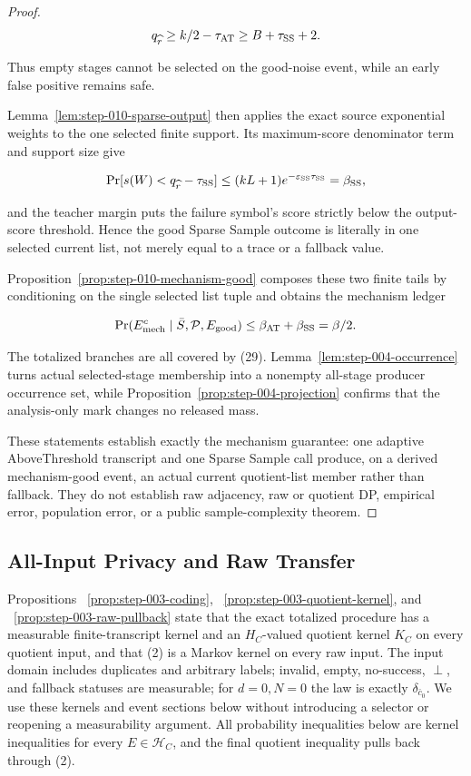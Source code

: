 \begin{proof}
\[
 q_{\widehat r}\geq k/2-\tau_{\rm AT}
 \geq B+\tau_{\rm SS}+2.
\]

Thus empty stages cannot be selected on the good-noise event, while an
early false positive remains safe.

Lemma~\ref{lem:step-010-sparse-output} then applies the exact source
exponential weights to the one selected finite support. Its maximum-score
denominator term and support size give

\[
 \Pr[s(W)<q_{\widehat r}-\tau_{\rm SS}]
 \leq(kL+1)e^{-\varepsilon_{\rm SS}\tau_{\rm SS}}
 =\beta_{\rm SS},
\]

and the teacher margin puts the failure symbol's score strictly below the
 output-score threshold. Hence the good Sparse Sample outcome is
literally in one selected current list, not merely equal to a trace or a
fallback value.

Proposition~\ref{prop:step-010-mechanism-good} composes these two finite
tails by conditioning on the single selected list tuple and obtains the
mechanism ledger

\[
 \Pr(E_{\rm mech}^c\mid\bar S,\mathcal P,E_{\rm good})
 \leq\beta_{\rm AT}+\beta_{\rm SS}=\beta/2.
\]

The totalized branches are all covered by (29). Lemma~\ref{lem:step-004-occurrence} turns actual selected-stage membership
into a nonempty all-stage producer occurrence set, while Proposition~\ref{prop:step-004-projection} confirms that the analysis-only
mark changes no released mass.

These statements establish exactly the mechanism guarantee: one adaptive
AboveThreshold transcript and one Sparse Sample call produce, on a derived
mechanism-good event, an actual current quotient-list member rather than
fallback. They do not establish raw adjacency, raw or quotient DP,
empirical error, population error, or a public sample-complexity theorem.



\end{proof}

\subsection{All-Input Privacy and Raw Transfer}\label{app:step_011}


\noindent Propositions
  ~\ref{prop:step-003-coding},
  ~\ref{prop:step-003-quotient-kernel}, and
  ~\ref{prop:step-003-raw-pullback} state that the exact totalized procedure
  has a measurable finite-transcript kernel and an \(H_C\)-valued quotient
  kernel \(K_C\) on every quotient input, and that (2) is a Markov kernel on
  every raw input. The input domain includes duplicates and arbitrary labels;
  invalid, empty, no-success, \(\perp\), and fallback statuses are measurable;
  for \(d=0,N=0\) the law is exactly \(\delta_{\bar c_0}\). We use these
  kernels and event sections below without introducing a selector or
  reopening a measurability argument. All probability inequalities below are
  kernel inequalities for every \(E\in\mathcal H_C\), and the final quotient
  inequality pulls back through (2).

